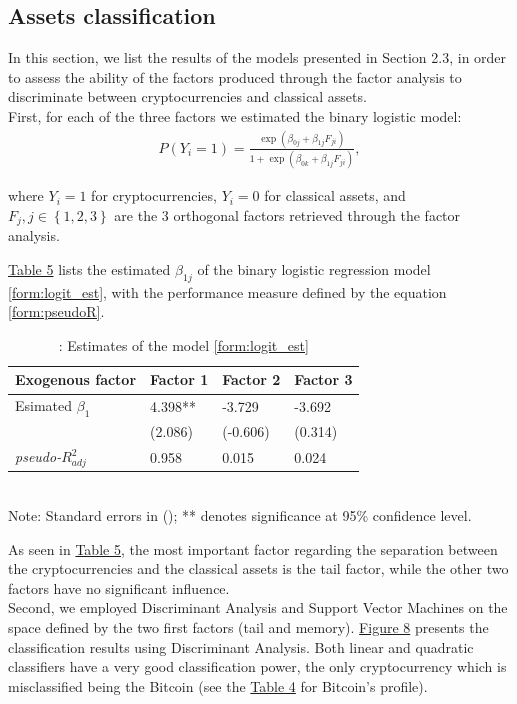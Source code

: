 \begin{table}[H]
{\begin{tabular}
			\hline \hline
	\end{tabular}}

\end{table}




\subsection{Assets classification}

In this section, we list the results of the models presented in Section 2.3, in order to assess the ability of the factors produced through the factor analysis to discriminate between cryptocurrencies and classical assets.\\
First, for each of the three factors we estimated the binary logistic model:
\begin{align} \label{form:logit_est}
P(Y_{i}=1)=\frac{\exp(\beta_{0 j}+\beta_{1 j} F_{j i})}{1+\exp(\beta_{0 k}+\beta_{1 j} F_{j i})},
\end{align}

where $Y_{i}=1$ for cryptocurrencies, $Y_{i}=0$ for classical assets, and $F_j, j\in\left\{1,2,3\right\}$ are the $3$ orthogonal factors retrieved through the factor analysis.

\hyperref[table:table_5]{Table 5} lists the estimated $\beta_{1 j}$ of the binary logistic regression model \ref{form:logit_est}, with the performance measure defined by the equation \ref{form:pseudoR}.

\begin{table}[!ht]
\centering
\small{
\caption{: Estimates of the model \ref{form:logit_est}}
\label{table:table_5}
\begin{tabular}{p{1.5in} p{0.7in} p{0.7in} p{0.7in} } \hline \hline
	\textbf{Exogenous factor} & \textbf{Factor 1} & \textbf{Factor 2} & \textbf{Factor 3} \\ \hline 
	Esimated $\beta_{1}$ & 4.398** & -3.729 & -3.692 \\  
	& (2.086) & (-0.606) & (0.314) \\
	\textit{pseudo-}$R_{adj}^{2} $ & 0.958 & 0.015 & 0.024 \\  
	\hline \hline
\end{tabular}
\\Note: Standard errors in (); ** denotes significance at 95\% confidence level.
\noindent }
\end{table}

As seen in \hyperref[table:table_5]{Table 5}, the most important factor regarding the separation between the cryptocurrencies and the classical assets is the tail factor, while the other two factors have no significant influence.\\
Second, we employed Discriminant Analysis and Support Vector Machines on the space defined by the two first factors (tail and memory).
\hyperref[fig:figure_8]{Figure 8} presents the classification results using Discriminant Analysis. Both linear and quadratic classifiers have a very good classification power, the only cryptocurrency which is misclassified being the Bitcoin (see the \hyperref[table:table_4]{Table 4} for Bitcoin's profile).


